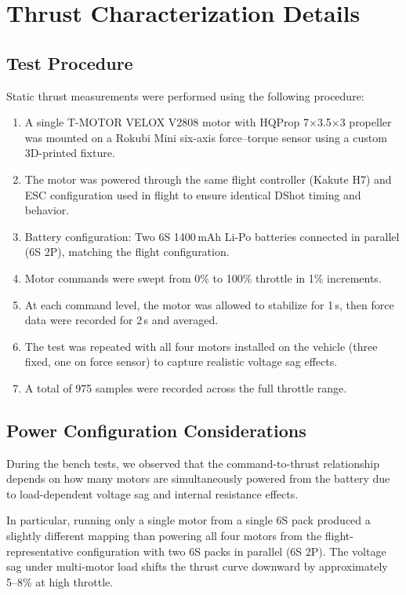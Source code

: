 \section{Thrust Characterization Details}\label{sec:thrust-map-detailed}

\subsection{Test Procedure}

Static thrust measurements were performed using the following procedure:

\begin{enumerate}
\item A single T-MOTOR VELOX V2808 motor with HQProp 7×3.5×3 propeller was mounted on a Rokubi Mini six-axis force--torque sensor using a custom 3D-printed fixture.
\item The motor was powered through the same flight controller (Kakute H7) and ESC configuration used in flight to ensure identical DShot timing and behavior.
\item Battery configuration: Two 6S 1400\,mAh Li-Po batteries connected in parallel (6S 2P), matching the flight configuration.
\item Motor commands were swept from 0\% to 100\% throttle in 1\% increments.
\item At each command level, the motor was allowed to stabilize for 1\,s, then force data were recorded for 2\,s and averaged.
\item The test was repeated with all four motors installed on the vehicle (three fixed, one on force sensor) to capture realistic voltage sag effects.
\item A total of 975 samples were recorded across the full throttle range.
\end{enumerate}

\subsection{Power Configuration Considerations}

During the bench tests, we observed that the command-to-thrust relationship depends on how many motors are simultaneously powered from the battery due to load-dependent voltage sag and internal resistance effects.

In particular, running only a single motor from a single 6S pack produced a slightly different mapping than powering all four motors from the flight-representative configuration with two 6S packs in parallel (6S 2P). The voltage sag under multi-motor load shifts the thrust curve downward by approximately 5--8\% at high throttle.

